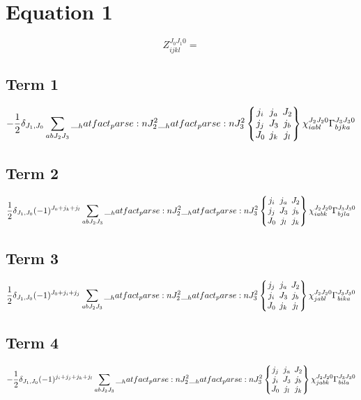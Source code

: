 \documentclass{scrartcl}
\newcommand{\ninej}[9]{\begingroup\setlength{\arraycolsep}{0.2em}\begin{Bmatrix} #1 & #2 & #3 \\ #4 & #5 & #6 \\ #7 & #8 & #9 \end{Bmatrix}\endgroup}
\begin{document}
\section{Equation 1}
\begin{dmath*}
Z_{i j k l}^{{J}_{0} {J}_{1} 0} = 
\end{dmath*}
\subsection{Term 1}
\begin{dmath*}
-\frac{1}{2} \* \delta_{{J}_{1},{J}_{0}} \* \sum_{a b {J}_{2} {J}_{3}} \* \hatfact{{J}_{2}^{2}} \* \hatfact{{J}_{3}^{2}} \* \ninej{{j}_{i}}{{j}_{a}}{{J}_{2}}{{j}_{j}}{{J}_{3}}{{j}_{b}}{{J}_{0}}{{j}_{k}}{{j}_{l}} \* \chi_{i a b l}^{{J}_{2} {J}_{2} 0} \* \Gamma_{b j k a}^{{J}_{3} {J}_{3} 0}
\end{dmath*}
\subsection{Term 2}
\begin{dmath*}
\frac{1}{2} \* \delta_{{J}_{1},{J}_{0}} \* (-1)^{{J}_{0}+{j}_{k}+{j}_{l}} \* \sum_{a b {J}_{2} {J}_{3}} \* \hatfact{{J}_{2}^{2}} \* \hatfact{{J}_{3}^{2}} \* \ninej{{j}_{i}}{{j}_{a}}{{J}_{2}}{{j}_{j}}{{J}_{3}}{{j}_{b}}{{J}_{0}}{{j}_{l}}{{j}_{k}} \* \chi_{i a b k}^{{J}_{2} {J}_{2} 0} \* \Gamma_{b j l a}^{{J}_{3} {J}_{3} 0}
\end{dmath*}
\subsection{Term 3}
\begin{dmath*}
\frac{1}{2} \* \delta_{{J}_{1},{J}_{0}} \* (-1)^{{J}_{0}+{j}_{i}+{j}_{j}} \* \sum_{a b {J}_{2} {J}_{3}} \* \hatfact{{J}_{2}^{2}} \* \hatfact{{J}_{3}^{2}} \* \ninej{{j}_{j}}{{j}_{a}}{{J}_{2}}{{j}_{i}}{{J}_{3}}{{j}_{b}}{{J}_{0}}{{j}_{k}}{{j}_{l}} \* \chi_{j a b l}^{{J}_{2} {J}_{2} 0} \* \Gamma_{b i k a}^{{J}_{3} {J}_{3} 0}
\end{dmath*}
\subsection{Term 4}
\begin{dmath*}
-\frac{1}{2} \* \delta_{{J}_{1},{J}_{0}} \* (-1)^{{j}_{i}+{j}_{j}+{j}_{k}+{j}_{l}} \* \sum_{a b {J}_{2} {J}_{3}} \* \hatfact{{J}_{2}^{2}} \* \hatfact{{J}_{3}^{2}} \* \ninej{{j}_{j}}{{j}_{a}}{{J}_{2}}{{j}_{i}}{{J}_{3}}{{j}_{b}}{{J}_{0}}{{j}_{l}}{{j}_{k}} \* \chi_{j a b k}^{{J}_{2} {J}_{2} 0} \* \Gamma_{b i l a}^{{J}_{3} {J}_{3} 0}
\end{dmath*}
\end{document}
